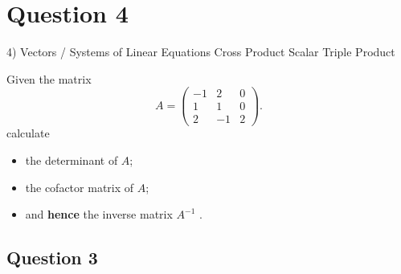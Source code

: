 \documentclass[12pt,a4paper]{article}
\begin{document}
	\section*{Question 4}
	4) Vectors / Systems of Linear Equations
	Cross Product
	Scalar Triple Product
	
	
	Given the  matrix 
	\begin{equation*}
	A=\left( \begin{array}{rrr}
	-1 & 2 & 0\\
	1 & 1 & 0\\
	2 & -1 & 2
	\end{array} \right).
	\end{equation*}
	calculate
	\begin{itemize}
		\item the determinant of $A$;
		\item the cofactor matrix of $A$;
		\item and {\bf hence} the inverse matrix $A^{-1}$ .
	\end{itemize}
	\subsection*{Question 3}
	
\end{document}
